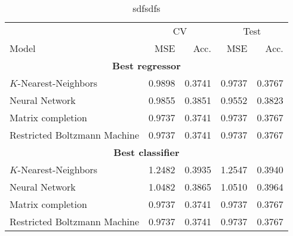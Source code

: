\begin{table}
\centering
\begin{tabular}{lrrrr}
\toprule
	      &  \multicolumn{2}{c}{CV} & \multicolumn{2}{c}{Test} \\
           \cmidrule(lr){2-3}\cmidrule(lr){4-5}
Model	 &  MSE & Acc. & MSE & Acc.  \\
\midrule
\multicolumn{5}{c}{\textbf{Best regressor}}\\
$K$-Nearest-Neighbors 					&   0.9898 &      0.3741 &   0.9737 &        0.3767 \\
Neural Network 							&   0.9855 &      0.3851 &   0.9552 &        0.3823 \\
Matrix completion 						&   0.9737 &      0.3741 &   0.9737 &        0.3767 \\
Restricted Boltzmann Machine 			&   0.9737 &      0.3741 &   0.9737 &        0.3767 \\
\midrule
\multicolumn{5}{c}{\textbf{Best classifier}}\\
$K$-Nearest-Neighbors 					&   1.2482 &      0.3935 &   1.2547 &        0.3940 \\
Neural Network 							&   1.0482 &      0.3865 &   1.0510 &        0.3964 \\
Matrix completion 						&   0.9737 &      0.3741 &   0.9737 &        0.3767 \\
Restricted Boltzmann Machine 			&   0.9737 &      0.3741 &   0.9737 &        0.3767 \\
\bottomrule
\end{tabular}
\caption{sdfsdfs}
\label{tab:results.model}
\end{table}
